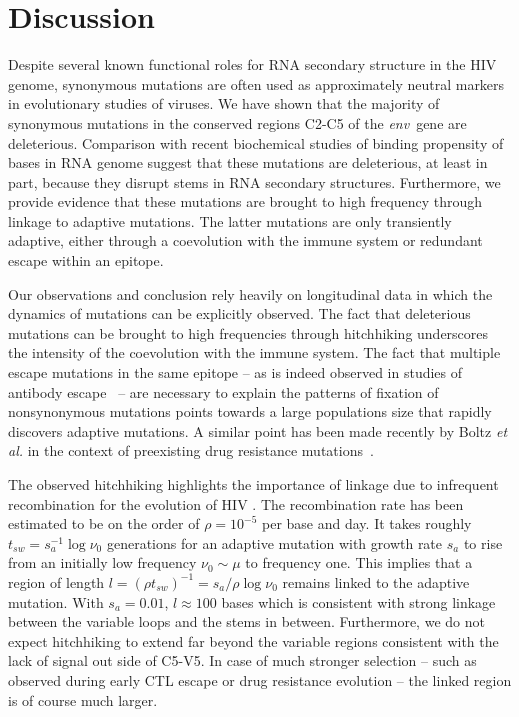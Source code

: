 \documentclass[rmp, twocolumn]{revtex4}
\newcommand{\env}{\textit{env}}
\begin{document}
\section{Discussion}
Despite several known functional roles for RNA secondary structure in the HIV
genome, synonymous mutations are often used as approximately neutral markers in
evolutionary studies of viruses. We have shown that the majority of synonymous
mutations in the conserved regions C2-C5 of the \env~gene are deleterious.
Comparison with recent biochemical studies of binding propensity of bases in RNA
genome suggest that these mutations are deleterious, at least in part, because they disrupt
stems in RNA secondary structures. Furthermore, we provide evidence that these
mutations are brought to high frequency through linkage to adaptive mutations.
The latter mutations are only transiently adaptive, either through a
coevolution with the immune system or redundant escape within an epitope. 

Our observations and conclusion rely heavily on longitudinal data in which the
dynamics of mutations can be explicitly observed. The fact that deleterious
mutations can be brought to high frequencies through hitchhiking underscores
the intensity of the coevolution with the immune system. The fact that
multiple escape mutations in the same epitope -- as is indeed observed in
studies of antibody escape~\citep{moore_limited_2009, bar_early_2012} -- are
necessary to explain the patterns of fixation of nonsynonymous mutations points
towards a large populations size that rapidly discovers adaptive mutations. A
similar point has been made recently by Boltz {\it et al.} in the context of
preexisting drug resistance mutations~\citep{boltz_ultrasensitive_2012}. 

The observed hitchhiking highlights the importance of linkage due to infrequent
recombination for the evolution of HIV
\citep{neher_recombination_2010,batorsky_estimate_2011,
josefsson_majority_2011}. The recombination rate has been estimated to be on the
order of $\rho = 10^{-5}$ per base and day. It takes roughly $t_{sw} = s_a^{-1}
\log \nu_0$ generations for an adaptive mutation with growth rate $s_a$ to rise
from an initially low frequency $\nu_0\sim \mu$ to frequency one. This implies
that a region of length $l = (\rho t_{sw})^{-1} = s_a / \rho \log \nu_0$ remains
linked to the adaptive mutation. With $s_a=0.01$, $l\approx 100$ bases which is
consistent with strong linkage between the variable loops and the stems in
between. Furthermore, we do not expect hitchhiking to extend far beyond
the variable regions consistent with the lack of signal out side of C5-V5. In
case of much stronger selection -- such as observed during early CTL escape or
drug resistance evolution -- the linked  region is of course much larger. 
\end{document}
